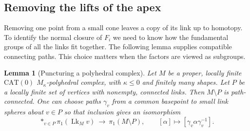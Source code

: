 \documentclass[11pt,a4paper]{article}
\newtheorem{lemma}[theorem]{Lemma}
\numberwithin{equation}{section}
\begin{document}
\subsection{Removing the lifts of the apex}

Removing one point from a small cone leaves a copy of its link up to
homotopy. To identify the normal closure of $F_i$ we need to know how the
fundamental groups of all the links fit together. The following lemma
supplies compatible connecting paths. This choice matters when the factors
are viewed as subgroups.

\begin{lemma}[Puncturing a polyhedral complex]
Let $M$ be a proper, locally finite $\mathrm{CAT}(0)$ $M_\kappa$-polyhedral
complex, with $\kappa\leq0$ and finitely many shapes. Let $P$ be a locally
finite set of vertices with nonempty, connected links. Then $M\setminus P$
is path-connected. One can choose paths $\gamma_v$ from a common basepoint
to small link spheres about $v\in P$ so that inclusion gives an isomorphism
\begin{equation}
 \mathop{\ast}_{v\in P}\pi_1(\operatorname{Lk}_M v)
    \ \longrightarrow\ \pi_1(M\setminus P),\qquad
    [\alpha]\longmapsto[\gamma_v\alpha\gamma_v^{-1}].
 \label{eq:punctured-free-factors}
\end{equation}
\end{lemma}
\end{document}
